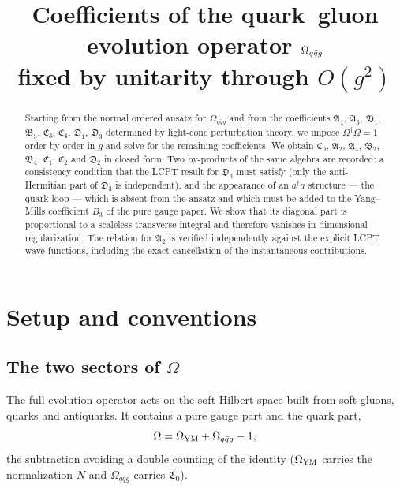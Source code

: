 \documentclass[11pt]{article}
\title{\bf Coefficients of the quark--gluon evolution operator $\OM_{q\bar q g}$\\
fixed by unitarity through $O(g^{2})$}
\date{}
\author{}
\newcommand{\mf}{\mathfrak}
\newcommand{\dg}{\dagger}
\newcommand{\OM}{\Omega}
\begin{document}
\maketitle
\vspace{-1.3cm}

\begin{abstract}
\noindent
Starting from the normal ordered ansatz for $\OM_{q\bar qg}$ and from the coefficients
$\mf A_1$, $\mf A_3$, $\mf B_1$, $\mf B_3$, $\mf C_3$, $\mf C_4$, $\mf D_1$, $\mf D_3$ determined by light-cone
perturbation theory, we impose $\OM^{\dg}\OM=1$ order by order in $g$ and solve for the remaining
coefficients. We obtain $\mf C_0$, $\mf A_2$, $\mf A_4$, $\mf B_2$, $\mf B_4$, $\mf C_1$,
$\mf C_2$ and $\mf D_2$ in closed form. Two by-products of the same algebra are recorded: a
consistency condition that the LCPT result for $\mf D_3$ must satisfy (only the anti-Hermitian
part of $\mf D_3$ is independent), and the appearance of an $a^{\dg}a$ structure --- the quark
loop --- which is absent from the ansatz and which must be added to the Yang--Mills coefficient
$B_3$ of the pure gauge paper. We show that its diagonal part is proportional to a scaleless
transverse integral and therefore vanishes in dimensional regularization. The relation for
$\mf A_2$ is verified independently against the explicit LCPT wave functions, including the exact
cancellation of the instantaneous contributions.
\end{abstract}

\tableofcontents
\bigskip

\section{Setup and conventions}

\subsection{The two sectors of $\OM$}
\label{sec:twosectors}

The full evolution operator acts on the soft Hilbert space built from soft gluons, quarks and
antiquarks. It contains a pure gauge part and the quark part,
\begin{equation}
\OM=\OM_{\rm YM}+\OM_{q\bar qg}-1 ,
\label{eq:split}
\end{equation}
the subtraction avoiding a double counting of the identity ($\OM_{\rm YM}$ carries the
normalization $N$ and $\OM_{q\bar qg}$ carries $\mf C_0$).
\end{document}
